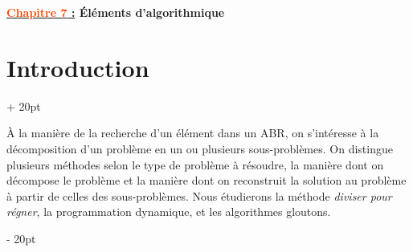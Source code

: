 \documentclass[a4paper, 12pt, twoside]{article}
\renewcommand{\emph}{\textcolor{ff4500}}
\newcommand{\ind}[1][20pt]{\advance\leftskip + #1}
\newcommand{\deind}[1][20pt]{\advance\leftskip - #1}
\newenvironment{indt}[2][20pt]{#2 \par \ind[#1]}{\par \deind} %
\newcommand{\thetitle}[2]{\begin{center}\textbf{{\LARGE \underline{\emph{#1} :}} {\Large #2}}\end{center}}
\begin{document}
    
    
    \thetitle{Chapitre 7}{\'Eléments d'algorithmique}
    
    \tableofcontents
    \newpage
    
    
    \begin{indt}{\section{Introduction}}
        
        \`A la manière de la recherche d'un élément dans un ABR, on s'intéresse à la décomposition d'un problème en un ou plusieurs sous-problèmes. On distingue plusieurs méthodes selon le type de problème à résoudre, la manière dont on décompose le problème et la manière dont on reconstruit la solution au problème à partir de celles des sous-problèmes. Nous étudierons la méthode \textit{diviser pour régner}, la programmation dynamique, et les algorithmes gloutons.
        
    \end{indt}
    
    \vspace{12pt}
    
\end{document}
